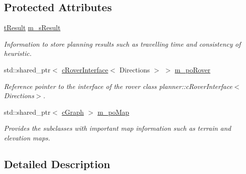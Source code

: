 \subsection*{Protected Attributes}
\begin{DoxyCompactItemize}
\item 
\mbox{\label{classplanner_1_1c_planner_interface_a78389ea53bd3c9d5c57851a338ee91d8}} 
\mbox{\hyperlink{structt_result}{t\+Result}} \mbox{\hyperlink{classplanner_1_1c_planner_interface_a78389ea53bd3c9d5c57851a338ee91d8}{m\+\_\+s\+Result}}
\begin{DoxyCompactList}\small\item\em Information to store planning results such as travelling time and consistency of heuristic. \end{DoxyCompactList}\item 
\mbox{\label{classplanner_1_1c_planner_interface_a41f578c25bb96ea00fade4c87aac87dc}} 
std\+::shared\+\_\+ptr$<$ \mbox{\hyperlink{classplanner_1_1c_rover_interface}{c\+Rover\+Interface}}$<$ Directions $>$ $>$ \mbox{\hyperlink{classplanner_1_1c_planner_interface_a41f578c25bb96ea00fade4c87aac87dc}{m\+\_\+po\+Rover}}
\begin{DoxyCompactList}\small\item\em Reference pointer to the interface of the rover class planner\+::c\+Rover\+Interface$<$\+Directions$>$. \end{DoxyCompactList}\item 
\mbox{\label{classplanner_1_1c_planner_interface_aa75ba58312d9398785d541a5e580a665}} 
std\+::shared\+\_\+ptr$<$ \mbox{\hyperlink{classplanner_1_1c_graph}{c\+Graph}} $>$ \mbox{\hyperlink{classplanner_1_1c_planner_interface_aa75ba58312d9398785d541a5e580a665}{m\+\_\+po\+Map}}
\begin{DoxyCompactList}\small\item\em Provides the subclasses with important map information such as terrain and elevation maps. \end{DoxyCompactList}\end{DoxyCompactItemize}


\subsection{Detailed Description}
